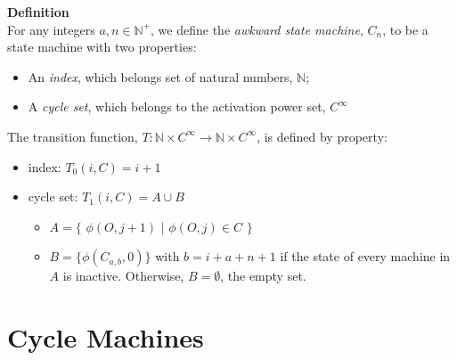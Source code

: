 \documentclass[a4paper,12pt]{article}
\begin{document}
\label{definition:cycle_machine}
\hypertarget{definition:cycle_machine}{}
\begin{tcolorbox}
\textbf{Definition}\\
For any integers $a, n \in \mathbb{N^+}$, we define the \textit{awkward state machine}, $C_n$, to be a state machine with two properties:

\begin{itemize}
\item An \textit{index}, which belongs set of natural numbers, $\mathbb{N}$;

\item A \textit{cycle set}, which belongs to the activation power set, $ C^{\infty}$

\end{itemize}

The transition function, $T: \mathbb{N} \times C^{\infty} \rightarrow \mathbb{N} \times C^{\infty}$, is defined by property:

\begin{itemize}

\item index: $T_0(i, C) = i + 1$

\item cycle set: $T_1(i, C) = A \cup B$
\begin{itemize}
\item $A = \{$ $\phi(O, j + 1)$ $|$ $\phi(O, j) \in C$ $\}$

\item $B = \{ \phi(C_{a, b}, 0) \}$ with $b = i + a + n + 1$ if the state of every machine in $A$ is inactive. Otherwise, $B = \emptyset$, the empty set.
\end{itemize}
\end{itemize}

\end{tcolorbox}










\section{Cycle Machines}
\label{section:cycle_machines}
\end{document}
